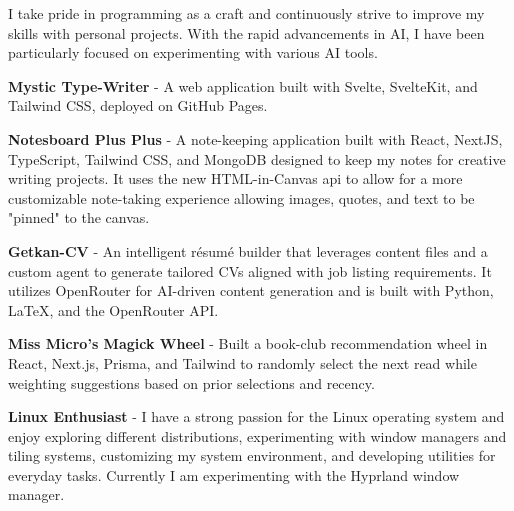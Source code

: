 

\begin{cventries}

  \cventry
  {} %
  {} %
  {} %
  {} %
  {
    \vspace{-10mm}
    \begin{cvitems}
      \item {I take pride in programming as a craft and continuously strive to improve my skills with personal projects. With the rapid advancements in AI, I have been particularly focused on experimenting with various AI tools.}
    \end{cvitems}
    \begin{cvsubitems}
      \item {\textbf{Mystic Type-Writer} - A web application built with Svelte, SvelteKit, and Tailwind CSS, deployed on GitHub Pages.}
      \item {\textbf{Notesboard Plus Plus} - A note-keeping application built with React, NextJS, TypeScript, Tailwind CSS, and MongoDB designed to keep my notes for creative writing projects.  It uses the new HTML-in-Canvas api to allow for a more customizable note-taking experience allowing images, quotes, and text to be "pinned" to the canvas.}
      \item {\textbf{Getkan-CV} - An intelligent résumé builder that leverages content files and a custom agent to generate tailored CVs aligned with job listing requirements. It utilizes OpenRouter for AI-driven content generation and is built with Python, LaTeX, and the OpenRouter API.}
    \end{cvsubitems}
    \begin{cvitems}
      \item {\textbf{Miss Micro's Magick Wheel} - Built a book-club recommendation wheel in React, Next.js, Prisma, and Tailwind to randomly select the next read while weighting suggestions based on prior selections and recency.}
    \end{cvitems}
    \begin{cvitems}
      \item {\textbf{Linux Enthusiast} - I have a strong passion for the Linux operating system and enjoy exploring different distributions, experimenting with window managers and tiling systems, customizing my system environment, and developing utilities for everyday tasks. Currently I am experimenting with the Hyprland window manager.}
    \end{cvitems}
  }
\end{cventries}
